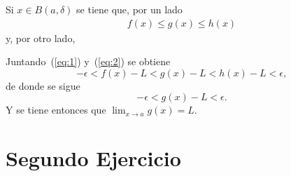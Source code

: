 \documentclass[fleqn,leqno,10pt,letterpaper,final]{article}
\begin{document}
Si $x\in B(a,\delta)$ se tiene que, por un lado
\begin{align}\label{eq:1}
	f(x)\leq g(x)\leq h(x)
\end{align}
y, por otro lado,

Juntando~(\ref{eq:1}) y~(\ref{eq:2}) se obtiene
\[
	-\epsilon<f(x)-L<g(x)-L<h(x)-L<\epsilon,
\]
de donde se sigue
\[
	-\epsilon<g(x)-L<\epsilon.
\]
Y se tiene entonces que $ \lim_{x\to a}g(x)=L $.

\section{Segundo Ejercicio}%
\end{document}
